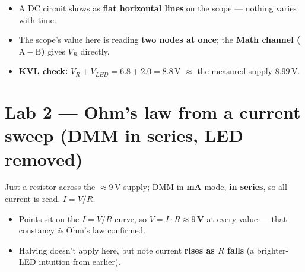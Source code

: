 \documentclass[11pt,a4paper]{article}
\begin{document}
\begin{itemize}
  \item A DC circuit shows as \textbf{flat horizontal lines} on the scope --- nothing varies with time.
  \item The scope's value here is reading \textbf{two nodes at once}; the \textbf{Math channel ($\mathrm{A}-\mathrm{B}$)} gives $V_R$ directly.
  \item \textbf{KVL check:} $V_R + V_{LED} = 6.8 + 2.0 = 8.8\,$V $\approx$ the measured supply $8.99\,$V. \checkmark
\end{itemize}

\section*{Lab 2 --- Ohm's law from a current sweep \hfill\normalfont\small (DMM in series, LED removed)}

Just a resistor across the $\approx 9$\,V supply; DMM in \textbf{mA} mode, \textbf{in series}, so all current is read. $I = V/R$.

\begin{center}
\end{center}

\begin{itemize}
  \item Points sit on the $I = V/R$ curve, so \textbf{$V = I\cdot R \approx 9$\,V} at every value --- that constancy \emph{is} Ohm's law confirmed.
  \item Halving doesn't apply here, but note current \textbf{rises as $R$ falls} (a brighter-LED intuition from earlier).
\end{itemize}
\end{document}
